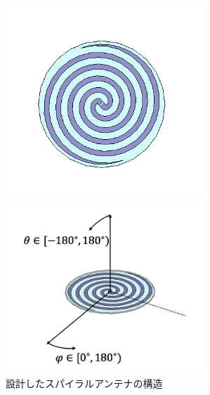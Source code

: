\documentclass[11pt,a4paper,uplatex]{ujarticle}
\begin{document}
  \begin{figure}[tbp]
    \begin{minipage}[b]{0.495\textwidth}
      \centering
      \includegraphics[keepaspectratio, width=75mm]{Images/spiral_antenna_configuration.png}
    \end{minipage}
    \begin{minipage}[b]{0.495\textwidth}
      \centering
      \includegraphics[keepaspectratio, width=75mm]{Images/spiral_withcord.png}
    \end{minipage}
    \caption{設計したスパイラルアンテナの構造}
    \label{fig:spiral_antenna_configuration}
  \end{figure}
\end{document}
